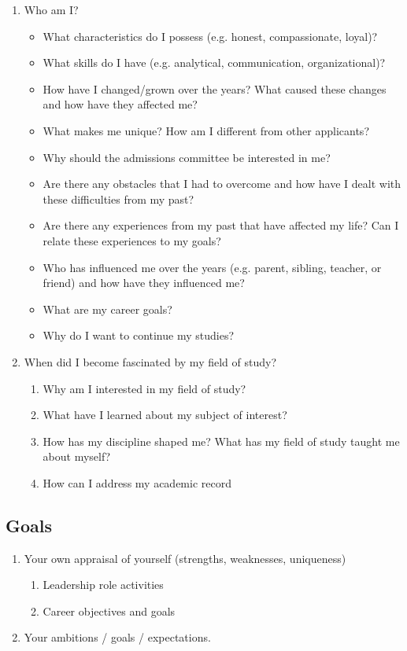 \documentclass[a4paper,12pt]{article}%
\begin{document}
\begin{enumerate}
\item  Who am I?	
\begin{itemize}
	\item What characteristics do I possess (e.g. honest, compassionate, loyal)?
	\item What skills do I have (e.g. analytical, communication, organizational)?
	\item How have I changed/grown over the years? What caused these changes and how have they affected me?
	\item What makes me unique? How am I different from other applicants?
	\item Why should the admissions committee be interested in me?
	\item Are there any obstacles that I had to overcome and how have I dealt with these difficulties from my past?
	\item Are there any experiences from my past that have affected my life? Can I relate these experiences to my goals?
	\item Who has influenced me over the years (e.g. parent, sibling, teacher, or friend) and how have they influenced me?
	\item What are my career goals?
	\item Why do I want to continue my studies?
\end{itemize}
 	  \hrulefill	 
 	  
	  \hrulefill
	  
\item When did I become fascinated by my field of study?
\begin{enumerate}
	\item Why am I interested in my field of study?
	\item What have I learned about my subject of interest?
	\item How has my discipline shaped me? What has my field of study taught me about myself?
	\item How can I address my academic record
\end{enumerate}
 		  \hrulefill	
 		   
	  \hrulefill
	  
	\end{enumerate}
	 \hrulefill
	 
	 \hrulefill
	 
\subsection{Goals}
\label{sec:Goals}
	\begin{enumerate}		
\item 	Your own appraisal of yourself (strengths, weaknesses, uniqueness)
		\begin{enumerate}		
	\item 	Leadership role activities
	\item 	  Career objectives and goals
	\end{enumerate}
		\item 		 	Your ambitions / goals / expectations.
	
\end{enumerate}
	  \hrulefill
	  
\end{document}
